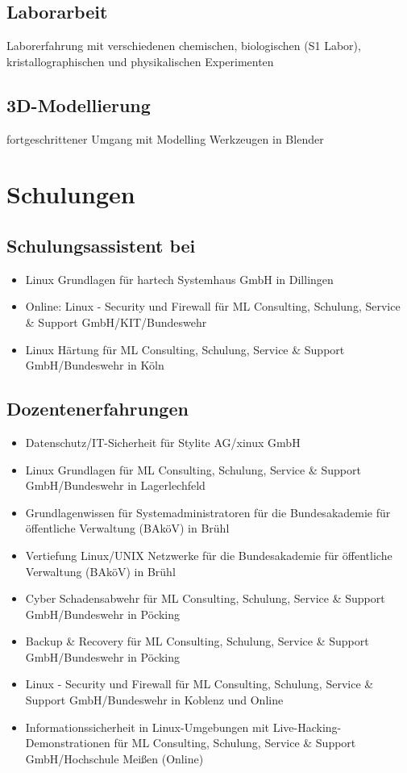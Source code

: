 \documentclass{article}
\begin{document}
\subsection{Laborarbeit}
Laborerfahrung mit verschiedenen chemischen, biologischen (S1 Labor), kristallographischen und physikalischen Experimenten

\subsection{3D-Modellierung}
fortgeschrittener Umgang mit Modelling Werkzeugen in Blender

\newpage

\section{Schulungen}

\subsection{Schulungsassistent bei}

\begin{itemize}
\item Linux Grundlagen für hartech Systemhaus GmbH in Dillingen
\item Online: Linux - Security und Firewall für ML Consulting, Schulung, Service \& Support GmbH/KIT/Bundeswehr
\item Linux Härtung für ML Consulting, Schulung, Service \& Support GmbH/Bundeswehr in Köln
\end{itemize}

\subsection{Dozentenerfahrungen}

\begin{itemize}
\item Datenschutz/IT-Sicherheit für Stylite AG/xinux GmbH
\item Linux Grundlagen für ML Consulting, Schulung, Service \& Support GmbH/Bundeswehr in Lagerlechfeld
\item Grundlagenwissen für Systemadministratoren für die Bundesakademie für öffentliche Verwaltung (BAköV) in Brühl
\item Vertiefung Linux/UNIX Netzwerke für die Bundesakademie für öffentliche Verwaltung (BAköV) in Brühl
\item Cyber Schadensabwehr für ML Consulting, Schulung, Service \& Support GmbH/Bundeswehr in Pöcking
\item Backup \& Recovery für ML Consulting, Schulung, Service \& Support GmbH/Bundeswehr in Pöcking
\item Linux - Security und Firewall für ML Consulting, Schulung, Service \& Support GmbH/Bundeswehr in Koblenz und Online
\item Informationssicherheit in Linux-Umgebungen mit Live-Hacking-Demonstrationen für ML Consulting, Schulung, Service \& Support GmbH/Hochschule Meißen (Online)
\end{itemize}
\end{document}
